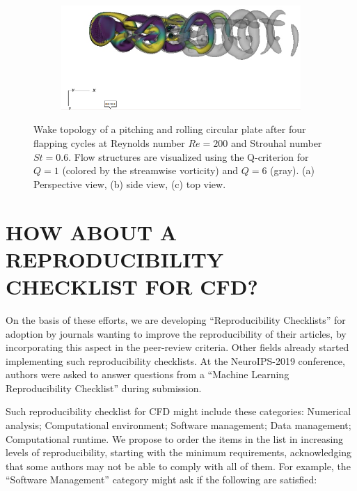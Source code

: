 \documentclass{parcfd}
\begin{document}
\begin{figure}
\begin{minipage}{0.3\textwidth}
        \vspace*{0cm}
        \begin{subfigure}{\linewidth}
            \includegraphics[width=\linewidth]{rollingpitching_top_view.png}
            \caption{}
            \label{fig:rollingpitching:top_view}
        \end{subfigure}
    \end{minipage}
    \caption{\small Wake topology of a pitching and rolling circular plate after four flapping cycles at Reynolds number $Re = 200$ and Strouhal number $St = 0.6$. Flow structures are visualized using the Q-criterion for $Q = 1$ (colored by the streamwise vorticity) and $Q = 6$ (gray). (a) Perspective view, (b) side view, (c) top view.}
    \label{fig:rollingpitching}
\end{figure}

\section{HOW ABOUT A REPRODUCIBILITY CHECKLIST FOR CFD?}

On the basis of these efforts, we are developing ``Reproducibility Checklists'' for adoption by journals wanting to improve the reproducibility of their articles, by incorporating this aspect in the peer-review criteria.
Other fields already started implementing such reproducibility checklists.
At the NeuroIPS-2019 conference, authors were asked to answer questions from a ``Machine Learning Reproducibility Checklist'' during submission.

Such reproducibility checklist for CFD might include these categories: Numerical analysis; Computational environment; Software management; Data management; Computational runtime.
We propose to order the items in the list in increasing levels of reproducibility, starting with the minimum requirements, acknowledging that some authors may not be able to comply with all of them.
For example, the ``Software Management'' category might ask if the following are satisfied:
\end{document}
